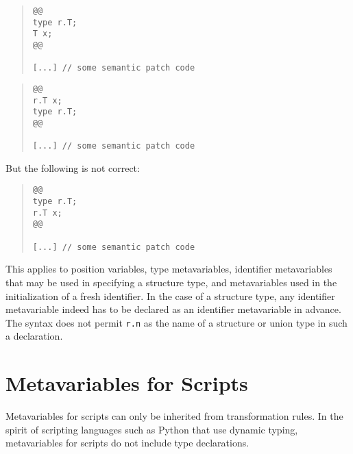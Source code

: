 \begin{quote}
\begin{verbatim}
@@
type r.T;
T x;
@@

[...] // some semantic patch code
\end{verbatim}
\end{quote}

\begin{quote}
\begin{verbatim}
@@
r.T x;
type r.T;
@@

[...] // some semantic patch code
\end{verbatim}
\end{quote}

\noindent
But the following is not correct:

\begin{quote}
\begin{verbatim}
@@
type r.T;
r.T x;
@@

[...] // some semantic patch code
\end{verbatim}
\end{quote}

This applies to position variables, type metavariables, identifier
metavariables that may be used in specifying a structure type, and
metavariables used in the initialization of a fresh identifier.  In the
case of a structure type, any identifier metavariable indeed has to be
declared as an identifier metavariable in advance.  The syntax does not
permit {\tt r.n} as the name of a structure or union type in such a
declaration.

\section{Metavariables for Scripts}

Metavariables for scripts can only be inherited from transformation rules.
In the spirit of scripting languages such as Python that use dynamic
typing, metavariables for scripts do not include type declarations.

\begin{grammar}

    


\end{grammar}

